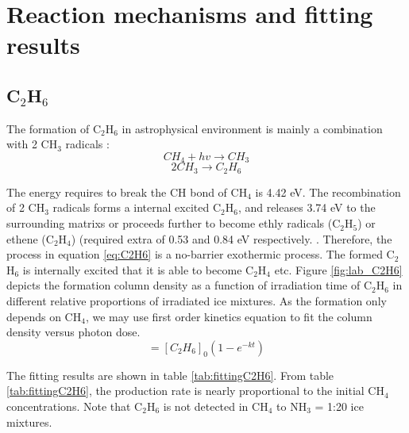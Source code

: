 \section{Reaction mechanisms and fitting results} %
\subsection{C$_2$H$_6$}
The formation of C$_2$H$_6$ in astrophysical environment is mainly a combination with 2 CH$_3$ radicals \cite{bennett2006laboratory}:
\begin{equation}
CH_4 + hv \rightarrow CH_3
\label{eq:CH3}
\end{equation}
\begin{equation}
2 CH_3 \rightarrow C_2H_6
\label{eq:C2H6}
\end{equation}

The energy requires to break the CH bond of CH$_4$ is 4.42 eV. The recombination of 2 CH$_3$ radicals forms a internal excited C$_2$H$_6$, and releases 3.74 eV to the surrounding matrixs or proceeds further to become ethly radicals (C$_2$H$_5$) or ethene (C$_2$H$_4$) (required extra of 0.53 and 0.84 eV respectively. \cite{bennett2006laboratory}. Therefore, the process in equation \ref{eq:C2H6} is a no-barrier exothermic process. The formed C$_2$H$_6$ is internally excited that it is able to become C$_2$H$_4$ etc. Figure \ref{fig:lab_C2H6} depicts the formation column density as a function of irradiation time of C$_2$H$_6$ in different relative proportions of irradiated ice mixtures.  As the formation only depends on CH$_4$, we may use first order kinetics equation to fit the column density versus photon dose.\\

\begin{equation}
[C_2H_6] = [C_2H_6]_0(1 - e^{-kt})
\label{eq:1step}
\end{equation}

The fitting results are shown in table \ref{tab:fittingC2H6}. From table \ref{tab:fittingC2H6}, the production rate is nearly proportional to the initial CH$_4$ concentrations.  Note that C$_2$H$_6$ is not detected in CH$_4$ to NH$_3$ = 1:20 ice mixtures.\\

